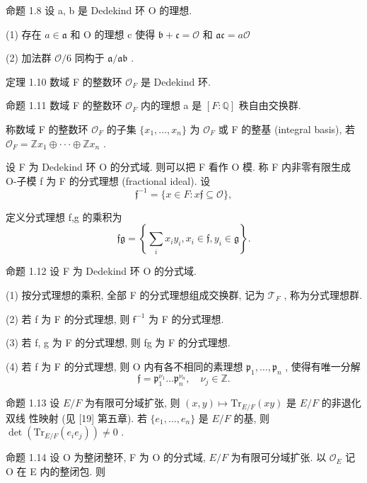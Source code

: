 \documentclass[]{article}
\begin{document}
{命题 1.8 设 a, b 是 Dedekind 环 O 的理想.  

(1) 存在 $a \in { \mathfrak { a } }$ 和 O 的理想 c 使得 ${ \mathfrak { b } } + { \mathfrak { c } } = { \mathcal { O } }$ 和 ${ \mathfrak { a c } } = a { \mathcal { O } }$ 

(2) 加法群 $\mathcal { O } / 6$ 同构于 ${ \mathfrak { a } } / { \mathfrak { a } } { \mathfrak { b } }$ . 

定理 1.10 数域 F 的整数环 ${ \mathcal { O } } _ { F }$ 是 Dedekind 环. 

命题 1.11 数域 F 的整数环 ${ \mathcal { O } } _ { F }$ 内的理想 a 是 $[ F : \mathbb { Q } ]$ 秩自由交换群. 

称数域 F 的整数环 ${ \mathcal { O } } _ { F }$ 的子集 $\{ x _ { 1 } , \ldots , x _ { n } \}$ 为 ${ \mathcal { O } } _ { F }$ 或 F 的整基 (integral basis), 若 $\mathcal { O } _ { F } = \mathbb { Z } x _ { 1 } \oplus \cdot \cdot \cdot \oplus \mathbb { Z } x _ { n }$ . 

设 F 为 Dedekind 环 O 的分式域. 则可以把 F 看作 O 模. 称 F 内非零有限生成 O-子模 f 为 F 的分式理想 (fractional ideal). 设 $$
\mathfrak {f} ^ {- 1} = \{x \in F: x \mathfrak {f} \subseteq \mathcal {O} \},
$$

定义分式理想 f,g 的乘积为 $$
\mathfrak {f g} = \left\{\sum_ {i} x _ {i} y _ {i}, x _ {i} \in \mathfrak {f}, y _ {i} \in \mathfrak {g} \right\}.
$$

命题 1.12 设 F 为 Dedekind 环 O 的分式域. 

(1) 按分式理想的乘积, 全部 F 的分式理想组成交换群, 记为 $\mathcal { T } _ { F }$ , 称为分式理想群. 

(2) 若 f 为 F 的分式理想, 则 $\mathsf { f } ^ { - 1 }$ 为 F 的分式理想. 

(3) 若 f, g 为 F 的分式理想, 则 fg 为 F 的分式理想. 

(4) 若 f 为 F 的分式理想, 则 O 内有各不相同的素理想 ${ \mathfrak { p } } _ { 1 } , \ldots , { \mathfrak { p } } _ { n }$ , 使得有唯一分解 $$
\mathfrak {f} = \mathfrak {p} _ {1} ^ {\nu_ {1}} \dots \mathfrak {p} _ {n} ^ {\nu_ {n}}, \quad \nu_ {j} \in \mathbb {Z}.
$$

命题 1.13 设 $E / F$ 为有限可分域扩张, 则 $( x , y ) \mapsto \mathrm { T r } _ { E / F } ( x y )$ 是 $E / F$ 的非退化双线 性映射 (见 [19] 第五章). 若 $\{ e _ { 1 } , \ldots , e _ { n } \}$ 是 $E / F$ 的基, 则 $\operatorname* { d e t } ( \mathrm { T r } _ { E / F } ( e _ { i } e _ { j } ) ) \neq 0$ . 

命题 1.14 设 O 为整闭整环, F 为 O 的分式域, $E / F$ 为有限可分域扩张. 以 $\mathcal { O } _ { E }$ 记 O 在 E 内的整闭包. 则 

}
\end{document}
